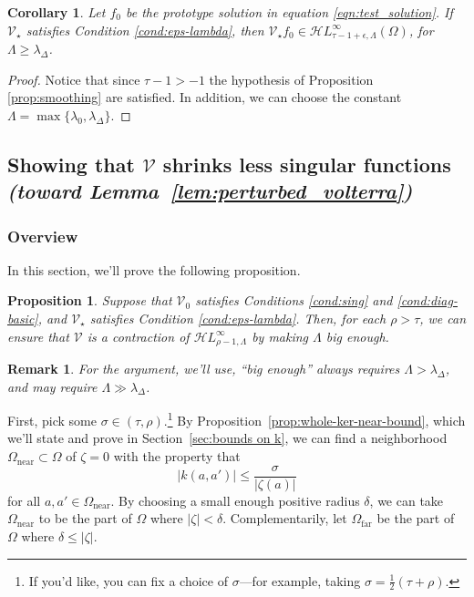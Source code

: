 \documentclass{article}
\theoremstyle{plain}
\newtheorem{prop}{Proposition}
\newtheorem{rmk}{Remark}
\newtheorem{cor}{Corollary}
\newcommand{\singexp}[2]{\mathcal{H}L^\infty_{#1, #2}}
\newcommand{\volterra}{\mathcal{V}}
\newcommand{\hardpart}{\mathcal{V}_0}
\newcommand{\softpart}{\mathcal{V}_\star}
\newcommand{\domain}{\Omega}
\newcommand{\near}{\Omega_\text{near}}
\newcommand{\far}{\Omega_\text{far}}
\begin{document}
\begin{cor}\label{cor:pertub_f0}
    Let $f_0$ be the prototype solution in equation \eqref{eqn:test_solution}. If $\softpart$ satisfies {\em Condition \eqref{cond:eps-lambda}}, then $\softpart f_0\in\singexp{\tau-1+\epsilon}{\Lambda}(\Omega)$, for $\Lambda\geq \lambda_\Delta$. 
\end{cor}
\begin{proof}
    Notice that since $\tau-1>-1$ the hypothesis of Proposition \ref{prop:smoothing} are satisfied. In addition, we can choose the constant $\Lambda=\max \{\lambda_0 , \lambda_\Delta\}$. 
\end{proof}

\subsection{Showing that $\volterra$ shrinks less singular functions \\ \textit{(toward Lemma~\ref{lem:perturbed_volterra})}}\label{sec:V is a contraction}
\subsubsection{Overview}
In this section, we'll prove the following proposition. %

\begin{prop}\label{prop:get-contraction}
Suppose that $\hardpart$ satisfies {\em Conditions \eqref{cond:sing}} and \eqref{cond:diag-basic}, and $\softpart$ satisfies {\em Condition \eqref{cond:eps-lambda}}. Then, for each $\rho > \tau$, we can ensure that $\volterra$ is a contraction of $\singexp{\rho-1}{\Lambda}$ by making $\Lambda$ big enough.
\end{prop}
\begin{rmk}
For the argument, we'll use, ``big enough'' always requires $\Lambda > \lambda_\Delta$, and may require $\Lambda \gg \lambda_\Delta$.
\end{rmk}
First, pick some $\sigma \in (\tau, \rho)$.\footnote{If you'd like, you can fix a choice of $\sigma$---for example, taking $\sigma = \frac{1}{2}(\tau + \rho)$.} By Proposition~\ref{prop:whole-ker-near-bound}, which we'll state and prove in Section~\ref{sec:bounds on k}, we can find a neighborhood $\near \subset \domain$ of $\zeta = 0$ with the property that
\begin{equation}\label{near-limit}
|k(a, a')| \le \frac{\sigma}{|\zeta(a)|}
\end{equation}
for all $a, a' \in \near$. By choosing a small enough positive radius $\delta$, we can take $\near$ to be the part of $\domain$ where $|\zeta| < \delta$. Complementarily, let $\far$ be the part of $\domain$ where $\delta \le |\zeta|$.
\end{document}
